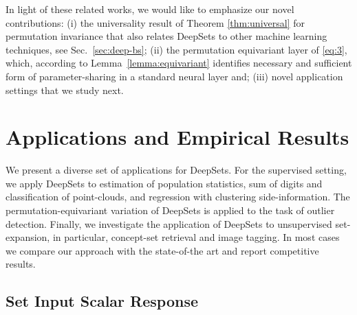 \documentclass{article}
\newcommand{\refsec}[1]{Sec.~\ref{#1}}
\newcommand{\refthm}[1]{Theorem \ref{#1}}
\newcommand{\deepsets}{DeepSets\xspace}
\begin{document}
In light of these related works, we would like to emphasize our novel contributions: (i) the universality result of \refthm{thm:universal} for permutation invariance that also relates \deepsets to other machine learning techniques, see \refsec{sec:deep-bs}; (ii) the permutation equivariant layer of \eqref{eq:3}, which, according to Lemma~\ref{lemma:equivariant} identifies necessary and sufficient form of parameter-sharing in a standard neural layer and; (iii) novel application settings that we study next. 

\section{Applications and Empirical Results}
\label{sec:experiments}
\vspace{-1mm}
We present a diverse set of applications for \deepsets.
For the supervised setting, we apply \deepsets to estimation of population statistics, sum of digits and classification of point-clouds, and regression with clustering side-information.
The permutation-equivariant variation of \deepsets is applied to the task of outlier detection.
Finally, we investigate the application of \deepsets to unsupervised set-expansion, in particular, concept-set retrieval and image tagging.
In most cases we compare our approach with the state-of-the art and report competitive results.

\subsection{Set Input Scalar Response}
\end{document}

